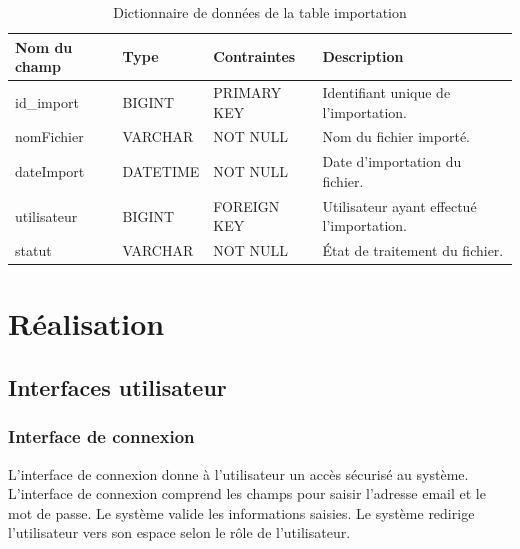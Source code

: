 \begin{table}[H]
	\centering
	\footnotesize
	
	\begin{tabularx}{\textwidth}{|p{3cm}|p{2.5cm}|p{3.5cm}|X|}
		\hline
		
		\rowcolor{blue!20}
		\textbf{Nom du champ}
		&
		\textbf{Type}
		&
		\textbf{Contraintes}
		&
		\textbf{Description}
		\\ \hline
		
		id\_import
		&
		BIGINT
		&
		PRIMARY KEY
		&
		Identifiant unique de l’importation.
		\\ \hline
		
		nomFichier
		&
		VARCHAR
		&
		NOT NULL
		&
		Nom du fichier importé.
		\\ \hline
		
		dateImport
		&
		DATETIME
		&
		NOT NULL
		&
		Date d’importation du fichier.
		\\ \hline
		
		utilisateur
		&
		BIGINT
		&
		FOREIGN KEY
		&
		Utilisateur ayant effectué l’importation.
		\\ \hline
		
		statut
		&
		VARCHAR
		&
		NOT NULL
		&
		État de traitement du fichier.
		\\ \hline
		
	\end{tabularx}
	
	\caption{Dictionnaire de données de la table importation}
	\label{tab:import_table}
	
\end{table}
\section{Réalisation}

\subsection{Interfaces utilisateur}

\subsubsection{Interface de connexion}

L’interface de connexion donne à l’utilisateur un accès sécurisé au système. L’interface de connexion comprend les champs pour saisir l’adresse email et le mot de passe. Le système valide les informations saisies. Le système redirige l’utilisateur vers son espace selon le rôle de l’utilisateur.

